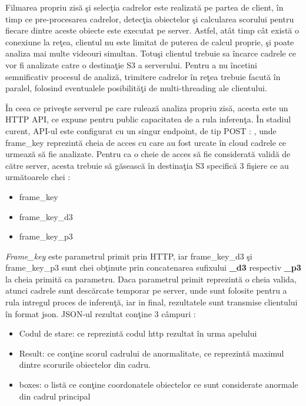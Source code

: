 \documentclass[a4paper,12pt]{report}
\begin{document}
\par
Filmarea propriu zisă şi selecţia cadrelor este realizată pe partea de client, în timp ce pre-procesarea cadrelor, detecţia obiectelor şi calcularea scorului pentru fiecare dintre aceste obiecte este executat pe server. Astfel, atât timp cât există o conexiune la reţea, clientul nu este limitat de puterea de calcul proprie, şi poate analiza mai multe videouri simultan. Totuşi clientul trebuie sa încarce cadrele ce vor fi analizate catre o destinaţie S3 a serverului. Pentru a nu încetini semnificativ procesul de analiză, trimitere cadrelor în reţea trebuie facută în paralel, folosind eventualele posibilităţi de multi-threading ale clientului.
\par
În ceea ce priveşte serverul pe care rulează analiza propriu zisă, acesta este un HTTP API, ce expune pentru public capacitatea de a rula inferenţa. În stadiul curent, API-ul este configurat cu un singur endpoint, de tip POST  :  , unde frame\_key reprezintă cheia de acces cu care au fost urcate în cloud cadrele ce urmează să fie analizate. Pentru ca o cheie de acces să fie considerată validă de către server, acesta trebuie să găsească în destinaţia S3 specifică 3 fişiere ce au următoarele chei :
\begin{itemize}
\item frame\_key
\item frame\_key\_d3
\item frame\_key\_p3
\end{itemize}
\par \emph{Frame\_key} este parametrul primit prin HTTP,  iar frame\_key\_d3 şi frame\_key\_p3 sunt chei obţinute prin concatenarea sufixului \textbf{\_d3} respectiv \textbf{\_p3} la cheia primită ca parametru. Daca parametrul primit reprezintă o cheia valida, atunci cadrele sunt descărcate temporar pe server, unde sunt folosite pentru a rula intregul proces de inferenţă, iar in final, rezultatele sunt transmise clientului în format json. 
JSON-ul rezultat conţine 3 câmpuri : 
\begin{itemize}
\item Codul de stare: ce reprezintă codul http rezultat în urma apelului
\item Result: ce conţine scorul cadrului de anormalitate, ce reprezintă maximul dintre scorurile obiectelor din cadru.
\item boxes: o listă ce conţine coordonatele obiectelor ce sunt considerate anormale din cadrul principal
\end{itemize}
\end{document}
